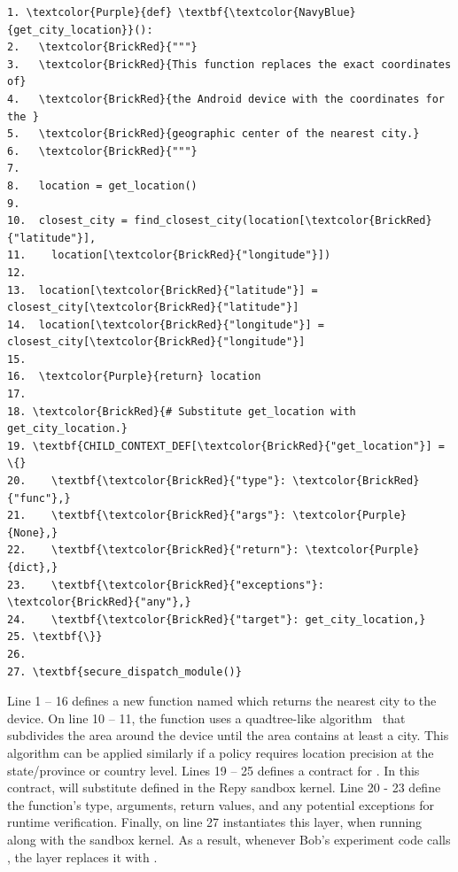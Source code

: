 \begin{Verbatim}
1. \textcolor{Purple}{def} \textbf{\textcolor{NavyBlue}{get_city_location}}():
2.   \textcolor{BrickRed}{"""}
3.   \textcolor{BrickRed}{This function replaces the exact coordinates of} 
4.   \textcolor{BrickRed}{the Android device with the coordinates for the } 
5.   \textcolor{BrickRed}{geographic center of the nearest city.}
6.   \textcolor{BrickRed}{"""}
7.
8.   location = get_location()
9.
10.  closest_city = find_closest_city(location[\textcolor{BrickRed}{"latitude"}],
11.    location[\textcolor{BrickRed}{"longitude"}])
12.
13.  location[\textcolor{BrickRed}{"latitude"}] = closest_city[\textcolor{BrickRed}{"latitude"}]
14.  location[\textcolor{BrickRed}{"longitude"}] = closest_city[\textcolor{BrickRed}{"longitude"}]
15.
16.  \textcolor{Purple}{return} location
17.
18. \textcolor{BrickRed}{# Substitute get_location with get_city_location.}
19. \textbf{CHILD_CONTEXT_DEF[\textcolor{BrickRed}{"get_location"}] = \{}
20.    \textbf{\textcolor{BrickRed}{"type"}: \textcolor{BrickRed}{"func"},}
21.    \textbf{\textcolor{BrickRed}{"args"}: \textcolor{Purple}{None},}
22.    \textbf{\textcolor{BrickRed}{"return"}: \textcolor{Purple}{dict},}
23.    \textbf{\textcolor{BrickRed}{"exceptions"}: \textcolor{BrickRed}{"any"},}
24.    \textbf{\textcolor{BrickRed}{"target"}: get_city_location,}
25. \textbf{\}}
26.
27. \textbf{secure_dispatch_module()}
\end{Verbatim}


Line 1 -- 16 defines a new function named  which returns 
the nearest city to the device. On line 10 -- 11, the function 
uses a quadtree-like algorithm~\cite{gruteser2003anonymous} that subdivides 
the area around the device until the area contains at least a city.
This algorithm can be applied similarly if a policy requires location 
precision at the state/province or country level.
Lines 19 -- 25 defines a contract for . 
In this contract, 
 will substitute  defined 
in the Repy sandbox kernel.
Line 20 - 23 define the function's type, arguments,
return values, and any potential exceptions for runtime verification. 
Finally,  on line 27 instantiates this
 layer, when running along with the sandbox kernel. 
As a result, 
whenever Bob's experiment code calls , 
the  layer replaces it with . 

